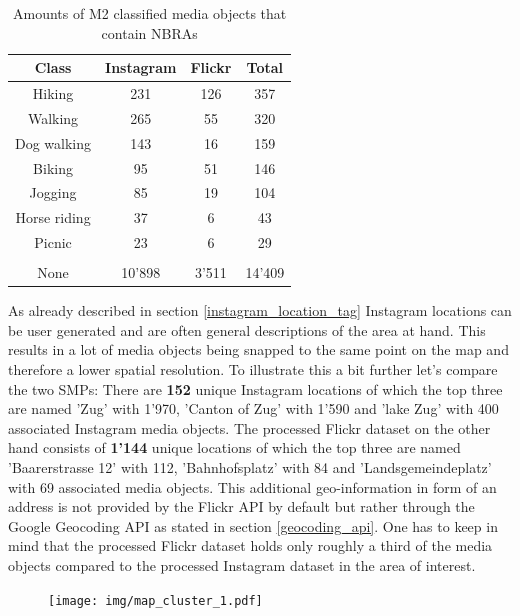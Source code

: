 \begin{table}[h!]
\begin{center}
\caption{Amounts of M2 classified media objects that contain NBRAs}\vspace{1ex}
\label{tab:amount_class_NBRAs}
\begin{tabular}{cccc}\hline
Class & Instagram & Flickr & Total\\ \hline
Hiking & 231 & 126 & 357\\
Walking & 265 & 55 & 320\\
Dog walking & 143 & 16 & 159\\
Biking & 95 & 51 & 146\\
Jogging & 85 & 19 & 104\\
Horse riding & 37 & 6 & 43\\
Picnic & 23 & 6 & 29\\
 & & & \\
None & 10'898 & 3'511 & 14'409\\
\hline
\end{tabular}
\end{center}
\end{table}

As already described in section \ref{instagram_location_tag} Instagram locations can be user generated and are often general descriptions of the area at hand. This results in a lot of media objects being snapped to the same point on the map and therefore a lower spatial resolution. To illustrate this a bit further let's compare the two SMPs:
There are \textbf{152} unique Instagram locations of which the top three are named 'Zug' with 1'970, 'Canton of Zug' with 1'590 and 'lake Zug' with 400 associated Instagram media objects.
The processed Flickr dataset on the other hand consists of \textbf{1'144} unique locations of which the top three are named 'Baarerstrasse 12' with 112, 'Bahnhofsplatz' with 84 and 'Landsgemeindeplatz' with 69 associated media objects. This additional geo-information in form of an address is not provided by the Flickr API by default but rather through the Google Geocoding API as stated in section \ref{geocoding_api}.
One has to keep in mind that the processed Flickr dataset holds only roughly a third of the media objects compared to the processed Instagram dataset in the area of interest. 

\begin{figure}[h!]
   \centering
   \texttt{[image: img/map\_cluster\_1.pdf]}
\end{figure}

